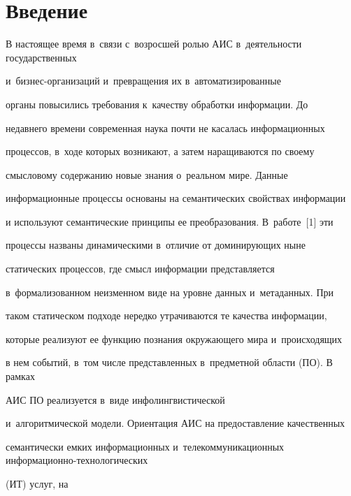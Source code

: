       \thispagestyle{headings}


  


\section{Введение}





\vspace*{2pt}





  В настоящее время в~связи с~возросшей ролью АИС в~деятельности государственных 


  и~биз\-нес-ор\-га\-ни\-за\-ций и~превращения их в~автоматизированные 


органы повысились требования к~качеству обработки информации. До 


недавнего времени современная наука почти не касалась информационных 


процессов, в~ходе которых возникают, а затем наращиваются по своему 


смысловому содержанию новые знания о~реальном мире. Данные 


информационные процессы основаны на семантических свойствах информации 


и используют семантические принципы ее преобразования. В~работе~[1] эти 


процессы названы динамическими в~отличие от доминирующих ныне 


статических процессов, где смысл информации представляется 


в~формализованном неизменном виде на уровне данных и~метаданных. При 


таком статическом подходе нередко утрачиваются те качества информации, 


которые реализуют ее функцию познания окружающего мира и~происходящих 


в нем событий, в~том числе представленных в~предметной области (ПО). В рамках 


АИС ПО реализуется в~виде инфолингвистической 


и~алгоритмической модели. Ориентация АИС на предоставление качественных 


семантически емких информационных и~телекоммуникационных ин\-фор\-ма\-ци\-он\-но-тех\-но\-ло\-ги\-че\-ских


(ИТ) услуг, на 


